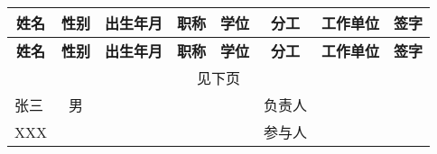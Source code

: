 \begin{center}
	\begin{longtable}{|m{48pt}|c|c|m{36pt}|c|m{36pt}|m{72pt}|c|}
		\hline
		\multicolumn{1}{|c|}{\bf 姓名} & {\bf 性别} & {\bf  出生年月} & \multicolumn{1}{c|}{\bf 职称} & {\bf 学位} & \multicolumn{1}{|c|}{\bf 分工} & \multicolumn{1}{c|}{\bf 工作单位} & {\bf  签字}\\
		\endfirsthead
		
		\hline
			\multicolumn{1}{|c|}{\bf 姓名} & {\bf 性别} & {\bf  出生年月} & {\bf 职称} & \multicolumn{1}{|c|}{\bf 学位} & \multicolumn{1}{|c|}{\bf 分工} & \multicolumn{1}{|c|}{\bf 工作单位} & {\bf  签字}\\
		\endhead
		
		\multicolumn{8}{|c|}{见下页}\\
		\hline
		\endfoot
		
		\hline
		\endlastfoot
	
	
		\hline
		张三 & 男  &  &   &   & 负责人 &  	&  \\
		\hline
		XXX &   &  &   &   & 参与人 &   	&  \\
		
	\end{longtable}
\end{center}
